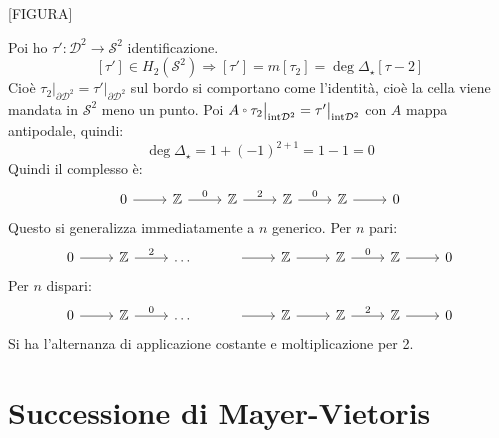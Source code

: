 \documentclass[10pt, twoside=false, x11names]{scrbook}
\newcommand{\Z}{\mathbb{Z}}
\newcommand{\Sph}[1][]{\mathcal{S}^#1}
\newcommand{\Disk}[1][]{\mathcal{D}^#1}
\let\latexcirc=\circ
\newcommand{\ccirc}{\mathbin{\mathchoice
  {\xcirc\scriptstyle}
  {\xcirc\scriptstyle}
  {\xcirc\scriptscriptstyle}
  {\xcirc\scriptscriptstyle}
}}
\newcommand{\xcirc}[1]{\vcenter{\hbox{$#1\latexcirc$}}}
\let\circ\ccirc
\begin{document}
[FIGURA]

Poi ho $ \tau' \colon \Disk{2} \to \Sph{2} $ identificazione.
\[
  [\tau'] \in H_2(\Sph{2}) \Rightarrow [\tau'] = m[\tau_2] = \deg{\Delta_\star}[\tau-2]
\]
Cioè
$ \tau_2 \big \lvert_{\partial \Disk{2}} = \tau' \big \lvert_{\partial \Disk{2}} $ sul bordo si
comportano come l'identità, cioè la cella viene mandata in $ \Sph{2} $ meno un
punto. Poi $ A \circ \tau_2 \big \lvert_{\mathrm{int} \Disk{2}} = \tau' \big \lvert_{\mathrm{int} \Disk{2}} $
con $ A $ mappa antipodale, quindi:
\[
  \deg{\Delta_\star} = 1 + (-1)^{2 + 1} = 1 - 1 = 0
\]
Quindi il complesso è:
\[
  \begin{tikzcd}
    0 \rar & \Z \rar{0} & \Z \rar{2} & \Z \rar{0}  & \Z \rar & 0
  \end{tikzcd}
\]
Questo si generalizza immediatamente a $ n $ generico.
Per $ n $ pari:
\[
  \begin{tikzcd}
    0 \rar & \Z \rar{2} & \dots & \rar & \Z \rar & \Z \rar{0} & \Z \rar & 0
  \end{tikzcd}
\]
Per $ n $ dispari:
\[
  \begin{tikzcd}
    0 \rar & \Z \rar{0} & \dots & \rar & \Z \rar & \Z \rar{2} & \Z \rar & 0
  \end{tikzcd}
\]
Si ha l'alternanza di applicazione costante e moltiplicazione per 2.

\section{Successione di Mayer-Vietoris}
\end{document}

